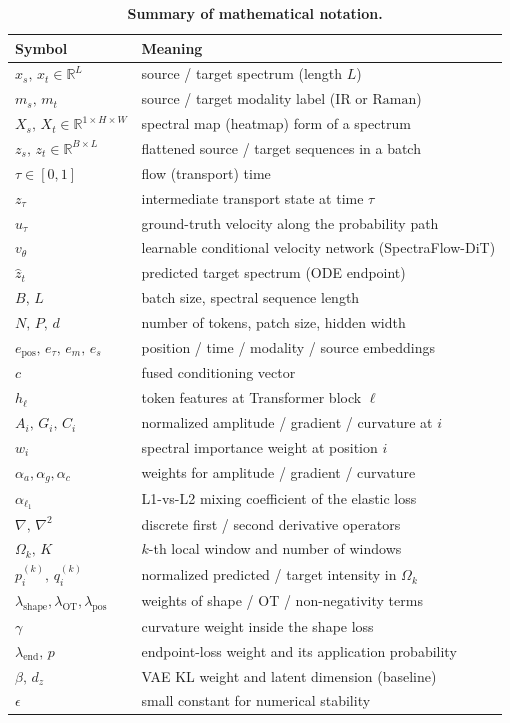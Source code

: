 \documentclass[pdflatex,sn-mathphys-num]{sn-jnl}%
\newcommand{\mname}{SpectraFlow}
\theoremstyle{thmstyleone}%
\theoremstyle{thmstyletwo}%
\theoremstyle{thmstylethree}%
\begin{document}
\begin{appendices}
\begin{table}[htbp]
\centering
\caption{\textbf{Summary of mathematical notation.}}
\label{tab:notation}
\begin{tabular}{@{}ll@{}}
\toprule
Symbol & Meaning \\
\midrule
$x_s,\,x_t\in\mathbb{R}^{L}$ & source / target spectrum (length $L$) \\
$m_s,\,m_t$ & source / target modality label ($\mathrm{IR}$ or $\mathrm{Raman}$) \\
$X_s,\,X_t\in\mathbb{R}^{1\times H\times W}$ & spectral map (heatmap) form of a spectrum \\
$z_s,\,z_t\in\mathbb{R}^{B\times L}$ & flattened source / target sequences in a batch \\
$\tau\in[0,1]$ & flow (transport) time \\
$z_\tau$ & intermediate transport state at time $\tau$ \\
$u_\tau$ & ground-truth velocity along the probability path \\
$v_\theta$ & learnable conditional velocity network (\mname-DiT) \\
$\hat{z}_t$ & predicted target spectrum (ODE endpoint) \\
$B,\,L$ & batch size, spectral sequence length \\
$N,\,P,\,d$ & number of tokens, patch size, hidden width \\
$e_{\mathrm{pos}},\,e_\tau,\,e_m,\,e_s$ & position / time / modality / source embeddings \\
$c$ & fused conditioning vector \\
$h_\ell$ & token features at Transformer block $\ell$ \\
$A_i,\,G_i,\,C_i$ & normalized amplitude / gradient / curvature at $i$ \\
$w_i$ & spectral importance weight at position $i$ \\
$\alpha_a,\alpha_g,\alpha_c$ & weights for amplitude / gradient / curvature \\
$\alpha_{\ell_1}$ & L1-vs-L2 mixing coefficient of the elastic loss \\
$\nabla,\,\nabla^2$ & discrete first / second derivative operators \\
$\Omega_k,\,K$ & $k$-th local window and number of windows \\
$p_i^{(k)},\,q_i^{(k)}$ & normalized predicted / target intensity in $\Omega_k$ \\
$\lambda_{\mathrm{shape}},\lambda_{\mathrm{OT}},\lambda_{\mathrm{pos}}$ & weights of shape / OT / non-negativity terms \\
$\gamma$ & curvature weight inside the shape loss \\
$\lambda_{\mathrm{end}},\,p$ & endpoint-loss weight and its application probability \\
$\beta,\,d_z$ & VAE KL weight and latent dimension (baseline) \\
$\epsilon$ & small constant for numerical stability \\
\bottomrule
\end{tabular}
\end{table}


\end{appendices}
\end{document}
